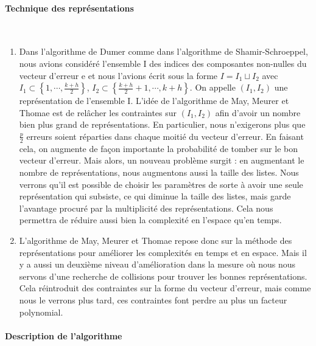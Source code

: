\documentclass[12pt,openany]{report}
\begin{document}
\paragraph{Technique des représentations }\cite{Ghazal} \\


\begin{enumerate}
\item Dans l’algorithme de Dumer comme dans l’algorithme de Shamir-Schroeppel,
nous avions considéré l’ensemble I des indices des composantes non-nulles du vecteur d’erreur e et nous l’avions écrit sous la forme $I =
I_1 \sqcup I_2 $ avec  $I_1 \subset \left\lbrace 1,\cdots,\frac{k+h}{2}
\right\rbrace $,  $I_2 \subset \left\lbrace  \frac{k+h}{
2} + 1,\cdots, k + h\right\rbrace $. On appelle
$(I_1, I_2)$ une représentation de l’ensemble I. L’idée de l’algorithme de
May, Meurer et Thomae est de relâcher les contraintes sur $(I_1, I_2)$ afin
d’avoir un nombre bien plus grand de représentations. En particulier,
nous n’exigerons plus que $\frac{p}{
2}$
erreurs soient réparties dans chaque moitié
du vecteur d’erreur. En faisant cela, on augmente de façon importante
la probabilité de tomber sur le bon vecteur d’erreur. Mais alors, un
nouveau problème surgit : en augmentant le nombre de représentations,
nous augmentons aussi la taille des listes. Nous verrons qu’il est possible
de choisir les paramètres de sorte à avoir une seule représentation qui
subsiste, ce qui diminue la taille des listes, mais garde l’avantage procuré
par la multiplicité des représentations. Cela nous permettra de réduire
aussi bien la complexité en l’espace qu’en temps.

\item L’algorithme de May, Meurer et Thomae repose donc sur la méthode des
représentations pour améliorer les complexités en temps et en espace.
Mais il y a aussi un deuxième niveau d’amélioration dans la mesure où
nous nous servons d’une recherche de collisions pour trouver les bonnes
représentations. Cela réintroduit des contraintes sur la forme du vecteur
d’erreur, mais comme nous le verrons plus tard, ces contraintes font
perdre au plus un facteur polynomial.

\end{enumerate}

\paragraph{Description de l'algorithme  }\cite{Ghazal}\\
\end{document}
